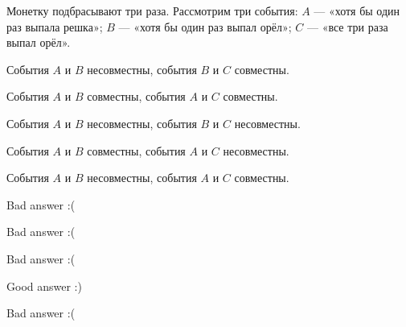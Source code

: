 
\begin{question}
Монетку подбрасывают три раза. Рассмотрим три события: \(A\) --- «хотя
бы один раз выпала решка»; \(B\) --- «хотя бы один раз выпал орёл»;
\(C\) --- «все три раза выпал орёл».
\begin{answerlist}
  \item События \(A\) и \(B\) несовместны, события \(B\) и \(C\) совместны.
  \item События \(A\) и \(B\) совместны, события \(A\) и \(C\) совместны.
  \item События \(A\) и \(B\) несовместны, события \(B\) и \(C\) несовместны.
  \item События \(A\) и \(B\) совместны, события \(A\) и \(C\) несовместны.
  \item События \(A\) и \(B\) несовместны, события \(A\) и \(C\) совместны.
\end{answerlist}
\end{question}

\begin{solution}
\begin{answerlist}
  \item Bad answer :(
  \item Bad answer :(
  \item Bad answer :(
  \item Good answer :)
  \item Bad answer :(
\end{answerlist}
\end{solution}

